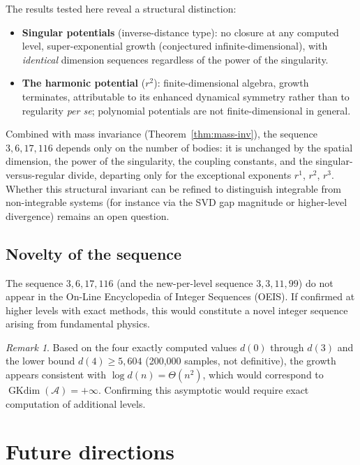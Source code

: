 \documentclass[11pt,a4paper]{article}
\theoremstyle{remark}
\newtheorem{remark}[theorem]{Remark}
\newcommand{\cA}{\mathcal{A}}
\DeclareMathOperator{\GKdim}{GKdim}
\begin{document}
The results tested here reveal a structural distinction:
\begin{itemize}[nosep]
  \item \textbf{Singular potentials} (inverse-distance type):
    no closure at any computed level, super-exponential growth
    (conjectured infinite-dimensional),
    with \emph{identical} dimension sequences regardless of the
    power of the singularity.
  \item \textbf{The harmonic potential} ($r^2$): finite-dimensional
    algebra, growth terminates, attributable to its enhanced
    dynamical symmetry rather than to regularity \emph{per se};
    polynomial potentials are not finite-dimensional in general.
\end{itemize}

Combined with mass invariance (Theorem~\ref{thm:mass-inv}),
the sequence $3, 6, 17, 116$ depends only on the number of
bodies: it is unchanged by the spatial dimension, the power of
the singularity, the coupling constants, and the
singular-versus-regular divide, departing only for the
exceptional exponents $r^1$,
$r^2$, $r^3$.  Whether this structural invariant can be refined to
distinguish integrable from non-integrable systems (for
instance via the SVD gap magnitude or higher-level divergence)
remains an open question.

\subsection{Novelty of the sequence}

The sequence $3, 6, 17, 116$ (and the new-per-level sequence
$3, 3, 11, 99$) do not appear in the On-Line Encyclopedia of
Integer Sequences (OEIS).  If confirmed at higher levels with
exact methods, this would constitute a novel integer sequence
arising from fundamental physics.

\begin{remark}
Based on the four exactly computed values $d(0)$ through $d(3)$
and the lower bound $d(4) \ge 5{,}604$ (200{,}000 samples, not
definitive), the growth appears
consistent with $\log d(n) = \Theta(n^2)$, which would
correspond to $\GKdim(\cA) = +\infty$.  Confirming this
asymptotic would require exact computation of additional levels.
\end{remark}


\section{Future directions}
\end{document}
